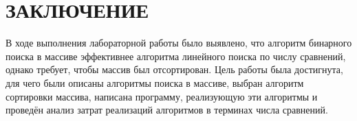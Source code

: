 \chapter*{ЗАКЛЮЧЕНИЕ}

В ходе выполнения лабораторной работы было выявлено, что алгоритм бинарного поиска в массиве эффективнее алгоритма линейного поиска по числу сравнений, однако требует, чтобы массив был отсортирован. Цель работы была достигнута, для чего были описаны алгоритмы поиска в массиве, выбран алгоритм сортировки массива, написана программу, реализующую эти алгоритмы и проведён анализ затрат реализаций алгоритмов в терминах числа сравнений.